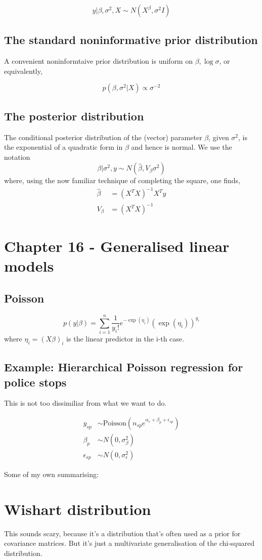 \documentclass[11pt]{amsart}
\newcommand{\Poisson}[1] {\text{Poisson} ( #1 )}
\begin{document}
\[
	y|\beta, \sigma^2, X \sim N(X^\beta, \sigma^2 I)
\]

\subsection{The standard noninformative prior distribution}
A convenient noninformtaive prior distribution is uniform on $\beta, 
\log{\sigma}$, or equivalently,

\[
	p(\beta, \sigma^2|X) \propto \sigma^{-2}
\]

\subsection{The posterior distribution}

The conditional posterior distribution of the (vector) parameter $\beta$,
given $\sigma^2$, is the exponential of a quadratic form in $\beta$ and hence
is normal. We use the notation
\[
	\beta|\sigma^2, y \sim N(\hat{\beta}, V_{\beta}\sigma^2)
\]
where, using the now familiar technique of completing the square, one finds,
\begin{align*}
	\hat{\beta} &= (X^T X)^{-1} X^T y\\
	V_{\beta} &= (X^T X)^{-1}
\end{align*}

\section{Chapter 16 - Generalised linear models}
\subsection{Poisson}
\[
	p(y|\beta) = \sum_{i=1}^n \frac{1}{y_i !} e^{- \exp{(\eta_i)}} (\exp{(\eta_i)})^{y_i}
\]
where $\eta_i = (X\beta)_i$ is the linear predictor in the i-th case.
\subsection{Example: Hierarchical Poisson regression for police stops}
This is not too dissimiliar from what we want to do.

\begin{align*}
y_{sp} & \sim \Poisson{n_{sp} e^{\alpha_e + \beta_p + \epsilon_{sp}}} \\
\beta_p & \sim N(0, \sigma_\beta^2) \\
\epsilon_{sp} & \sim N(0, \sigma_\epsilon^2)
\end{align*}


Some of my own summarising:
\section{Wishart distribution}
This sounds scary, because it's a distribution that's often used as a prior
for covariance matrices. But it's just a multivariate generalisation of the
chi-squared distribution.
\end{document}
